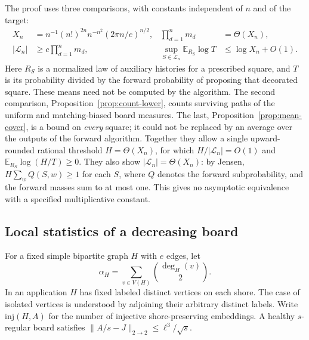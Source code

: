 \documentclass[11pt]{article}
\theoremstyle{definition}\newtheorem{definition}[theorem]{Definition}
\newcommand{\E}{\mathbb E}
\newcommand{\cL}{\mathcal L}
\newcommand{\inj}{\mathrm{inj}}
\begin{document}
The proof uses three comparisons, with constants independent of $n$ and of the target:
\begin{align}
 X_n&=n^{-1}(n!)^{2n}n^{-n^2}(2\pi n/e)^{n/2},
 &\prod_{d=1}^n m_d&=\Theta(X_n),\label{eq:scale}\\
 |\cL_n|&\ge c\prod_{d=1}^n m_d,
 &\sup_{S\in\cL_n}\E_{R_S}\log T&\le\log X_n+O(1).\label{eq:countlb}
\end{align}
Here $R_S$ is a normalized law of auxiliary histories for a prescribed square, and $T$ is its probability divided by the forward probability of proposing that decorated square. These means need not be computed by the algorithm. The second comparison, Proposition~\ref{prop:count-lower}, counts surviving paths of the uniform and matching-biased board measures. The last, Proposition~\ref{prop:mean-cover}, is a bound on \emph{every} square; it could not be replaced by an average over the outputs of the forward algorithm. Together they allow a single upward-rounded rational threshold $H=\Theta(X_n)$, for which $H/|\cL_n|=O(1)$ and $\E_{R_S}\log(H/T)\ge0$. They also show $|\cL_n|=\Theta(X_n)$: by Jensen, $H\sum_w Q(S,w)\ge1$ for each $S$, where $Q$ denotes the forward subprobability, and the forward masses sum to at most one. This gives no asymptotic equivalence with a specified multiplicative constant.
\subsection{Local statistics of a decreasing board}
For a fixed simple bipartite graph $H$ with $e$ edges, let
\[
  \alpha_H=\sum_{v\in V(H)}\binom{\deg_H(v)}2.
\]
In an application $H$ has fixed labeled distinct vertices on each shore. The case of isolated vertices is understood by adjoining their arbitrary distinct labels. Write $\inj(H,A)$ for the number of injective shore-preserving embeddings. A healthy $s$-regular board satisfies $\|A/s-J\|_{2\to2}\le\ell^3/\sqrt{s}$.
\end{document}
